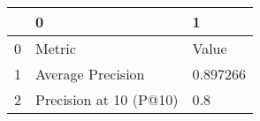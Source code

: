 \begin{tabular}{lll}
\toprule
{} &                       0 &         1 \\
\midrule
0 &                  Metric &     Value \\
1 &       Average Precision &  0.897266 \\
2 &  Precision at 10 (P@10) &       0.8 \\
\bottomrule
\end{tabular}
